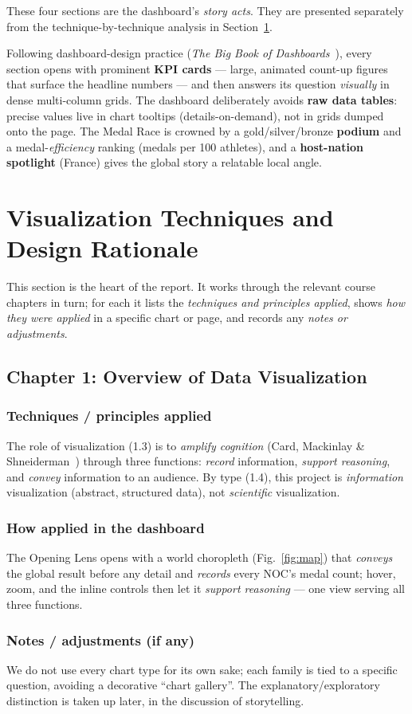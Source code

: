\documentclass[11pt]{article}
\newcommand{\applied}{\subsubsection*{\color{teal}Techniques / principles applied}}
\newcommand{\howapplied}{\subsubsection*{\color{ocean}How applied in the dashboard}}
\newcommand{\notesadj}{\subsubsection*{\color{coral}Notes / adjustments (if any)}}
\begin{document}
\noindent These four sections are the dashboard's \emph{story acts}. They are
presented separately from the technique-by-technique analysis in
Section~\ref{sec:techniques}.

Following dashboard-design practice (\emph{The Big Book of
Dashboards}~\cite{bigbook2017}), every section opens with prominent
\textbf{KPI cards} --- large, animated count-up figures that surface the headline
numbers --- and then answers its question \emph{visually} in dense multi-column
grids. The dashboard deliberately avoids \textbf{raw data tables}: precise values
live in chart tooltips (details-on-demand), not in grids dumped onto the page. The Medal Race is crowned by a gold/silver/bronze
\textbf{podium} and a medal-\emph{efficiency} ranking (medals per 100 athletes),
and a \textbf{host-nation spotlight} (France) gives the global story a relatable
local angle.

\section{Visualization Techniques and Design Rationale}
\label{sec:techniques}

This section is the heart of the report. It works through the relevant course
chapters in turn; for each it lists the \emph{techniques and principles applied},
shows \emph{how they were applied} in a specific chart or page, and records any
\emph{notes or adjustments}.

\subsection{Chapter 1: Overview of Data Visualization}
\applied
\begin{techbox}
The role of visualization (1.3) is to \emph{amplify cognition} (Card, Mackinlay \&
Shneiderman~\cite{card1999}) through three functions: \emph{record} information,
\emph{support reasoning}, and \emph{convey} information to an audience. By type
(1.4), this project is \emph{information} visualization (abstract, structured data),
not \emph{scientific} visualization.
\end{techbox}
\howapplied
The Opening Lens opens with a world choropleth (Fig.~\ref{fig:map}) that
\emph{conveys} the global result before any detail and \emph{records} every NOC's
medal count; hover, zoom, and the inline controls then let it
\emph{support reasoning} --- one view serving all three functions.
\notesadj
We do not use every chart type for its own sake; each family is tied to a
specific question, avoiding a decorative ``chart gallery''. The
explanatory/exploratory distinction is taken up later, in the discussion of
storytelling.
\end{document}

